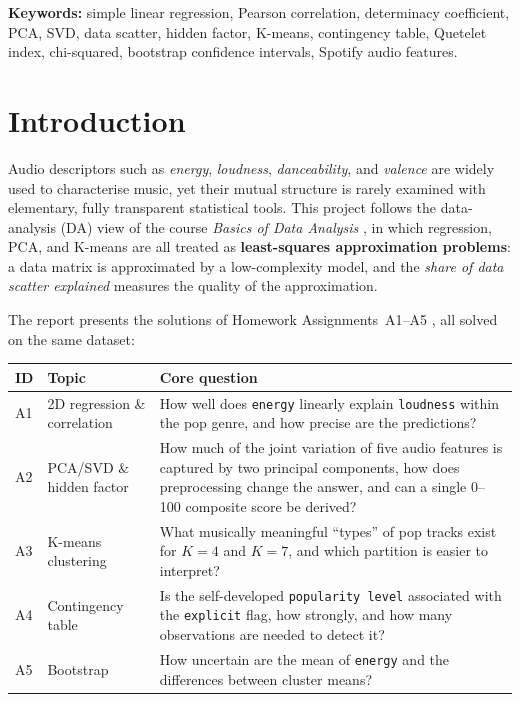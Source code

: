 \documentclass[11pt,letterpaper]{article}
\begin{document}
\begin{center}
\begin{minipage}{0.9\textwidth}
\medskip
\textbf{Keywords:} simple linear regression, Pearson correlation, determinacy
coefficient, PCA, SVD, data scatter, hidden factor, K-means, contingency
table, Quetelet index, chi-squared, bootstrap confidence intervals, Spotify
audio features.
\end{minipage}
\end{center}

\newpage
\tableofcontents
\newpage

\section{Introduction}\label{sec:intro}

Audio descriptors such as \textit{energy}, \textit{loudness},
\textit{danceability}, and \textit{valence} are widely used to characterise
music, yet their mutual structure is rarely examined with elementary, fully
transparent statistical tools. This project follows the data-analysis (DA)
view of the course \textit{Basics of Data Analysis}
\citep{lecture,lecture3,course}, in which regression, PCA, and K-means are all
treated as \textbf{least-squares approximation problems}: a data matrix is
approximated by a low-complexity model, and the \emph{share of data scatter
explained} measures the quality of the approximation.

The report presents the solutions of Homework Assignments~A1--A5
\citep{course}, all solved on the same dataset:

\begin{center}
\small
\begin{tabular}{@{}llp{8.2cm}@{}}
\toprule
ID & Topic & Core question \\
\midrule
A1 & 2D regression \& correlation & How well does \texttt{energy} linearly
explain \texttt{loudness} within the pop genre, and how precise are the
predictions? \\
A2 & PCA/SVD \& hidden factor & How much of the joint variation of five audio
features is captured by two principal components, how does preprocessing
change the answer, and can a single 0--100 composite score be derived? \\
A3 & K-means clustering & What musically meaningful ``types'' of pop tracks
exist for $K=4$ and $K=7$, and which partition is easier to interpret? \\
A4 & Contingency table & Is the self-developed \texttt{popularity level}
associated with the \texttt{explicit} flag, how strongly, and how many
observations are needed to detect it? \\
A5 & Bootstrap & How uncertain are the mean of \texttt{energy} and the
differences between cluster means? \\
\bottomrule
\end{tabular}
\end{center}
\end{document}
